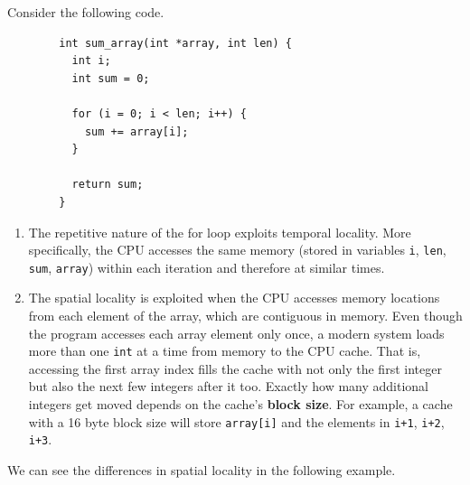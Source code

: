 \documentclass{article}
\begin{document}
    \begin{example}[Locality]
      Consider the following code. 
      \begin{lstlisting}
        int sum_array(int *array, int len) {
          int i;
          int sum = 0;

          for (i = 0; i < len; i++) {
            sum += array[i];
          }

          return sum;
        }
      \end{lstlisting}
      \begin{enumerate}
        \item The repetitive nature of the for loop exploits temporal locality. More specifically, the CPU accesses the same memory (stored in variables \texttt{i}, \texttt{len}, \texttt{sum}, \texttt{array}) within each iteration and therefore at similar times. 
        \item The spatial locality is exploited when the CPU accesses memory locations from each element of the array, which are contiguous in memory. Even though the program accesses each array element only once, a modern system loads more than one \texttt{int} at a time from memory to the CPU cache. That is, accessing the first array index fills the cache with not only the first integer but also the next few integers after it too. Exactly how many additional integers get moved depends on the cache's \textbf{block size}. For example, a cache with a 16 byte block size will store \texttt{array[i]} and the elements in \texttt{i+1}, \texttt{i+2}, \texttt{i+3}. 
      \end{enumerate}
    \end{example}

    We can see the differences in spatial locality in the following example. 
\end{document}
